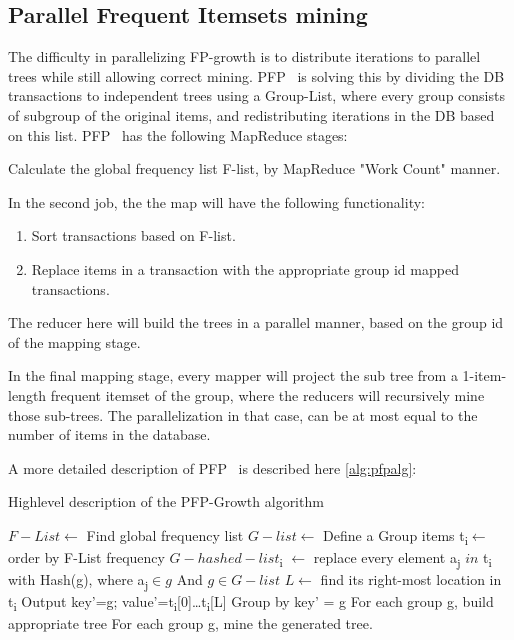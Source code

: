 \subsection{Parallel Frequent Itemsets mining}
\label{subs:PFP}
The difficulty in parallelizing FP-growth is to distribute iterations to parallel trees while still allowing correct mining. PFP~\cite{li2008pfp} is solving this by dividing the DB transactions to independent trees using a Group-List, where every group consists of subgroup of the original items, and redistributing iterations in the DB based on this list.
PFP~\cite{li2008pfp} has the following MapReduce stages:

\begin{steps}
\item Calculate the global frequency list F-list, by MapReduce "Work Count" manner.
\item In the second job, the the map will have the following functionality:
\begin{enumerate}
\item Sort transactions based on F-list.
\item Replace items in a transaction with the appropriate group id mapped transactions.
\end{enumerate}
	The reducer here will build the trees in a parallel manner, based on the group id of the mapping stage.
\item In the final mapping stage, every mapper will project the sub tree from a 1-item-length frequent itemset of the group, where the reducers will recursively mine those sub-trees. The parallelization in that case, can be at most equal to the number of items in the database.
\end{steps}

A more detailed description of PFP~\cite{li2008pfp} is described here \autoref{alg:pfpalg}:
\begin{algorithm}
  \caption{Highlevel description of the PFP-Growth algorithm}%
  \begin{algorithmic}
   \label{alg:pfpalg}
      \State $F-List\gets$ Find global frequency list
      \State $G-list\gets$ Define a Group items
        \State t\textsubscript{i}$\gets$ order by F-List frequency
		\State $G-hashed-list$\textsubscript{i} $\gets$ replace every element a\textsubscript{j} $in$ t\textsubscript{i} with Hash(g), where a\textsubscript{j}$\in g$ And $g\in G-list$
      		\State $L\gets$ find its right-most location in t\textsubscript{i}
      		\State Output key'=g; value'={t\textsubscript{i}[0]…t\textsubscript{i}[L]}
      	\EndFor
      \EndFor
 	\State Group by key' = g
 	\State For each group g, build appropriate tree
 	\State For each group g, mine the generated tree.
    \EndProcedure
  \end{algorithmic}
\end{algorithm}


